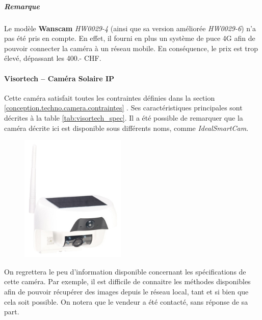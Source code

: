 \subparagraph{Remarque} Le modèle \textbf{Wanscam} \textit{HW0029-4} (ainsi que sa version améliorée \textit{HW0029-6}) n'a pas été pris en compte. En effet, il fourni en plus un système de puce 4G afin de pouvoir connecter la caméra à un réseau mobile. En conséquence, le prix est trop élevé, dépassant les 400.- CHF.

\paragraph{\textbf{Visortech} -- Caméra Solaire IP}
Cette caméra satisfait toutes les contraintes définies dans la section \ref{conception.techno.camera.contraintes} . Ses caractéristiques principales sont décrites à la table \ref{tab:visortech_spec}. Il a été possible de remarquer que la caméra décrite ici est disponible sous différents noms, comme \textit{IdealSmartCam}.

\begin{figure}[ht]
    \includegraphics[width=50mm]{img/conception/visortech_cam.jpg}
    \centering
\end{figure}

On regrettera le peu d'information disponible concernant les spécifications de cette caméra. Par exemple, il est difficile de connaitre les méthodes disponibles afin de pouvoir récupérer des images depuis le réseau local, tant et si bien que cela soit possible. On notera que le vendeur a été contacté, sans réponse de sa part.

